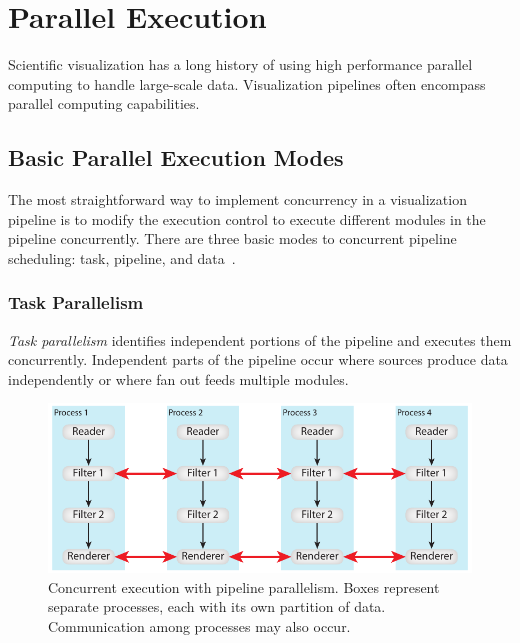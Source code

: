 \documentclass[journal,twocolumn,10pt,letterpaper,twoside]{IEEEtran}
\newcommand*{\lcite}[1]{~\cite{#1}}
\newcommand*{\keyterm}[1]{\emph{#1}}
\begin{document}
\section{Parallel Execution}
\label{sec:ParallelExecution}

Scientific visualization has a long history of using high performance
parallel computing to handle large-scale data.  Visualization pipelines
often encompass parallel computing capabilities.

\subsection{Basic Parallel Execution Modes}
\label{sec:ParallelExecution:Modes}

The most straightforward way to implement concurrency in a visualization
pipeline is to modify the execution control to execute different modules
in the pipeline concurrently.  There are three basic modes to concurrent
pipeline scheduling: task, pipeline, and data\lcite{Ahrens2000}.

\subsubsection{Task Parallelism}
\label{sec:TaskParallelism}

\keyterm{Task parallelism} identifies independent portions of the pipeline
and executes them concurrently.  Independent parts of the pipeline occur
where sources produce data independently or where fan out feeds multiple
modules.

\begin{figure}[htbp]
  \centering
  \includegraphics[scale=.9]{images/DataParallel}
  \caption{Concurrent execution with pipeline parallelism.  Boxes represent
    separate processes, each with its own partition of data.  Communication
    among processes may also occur.}
  \label{fig:DataParallelism}
\end{figure}
\end{document}
